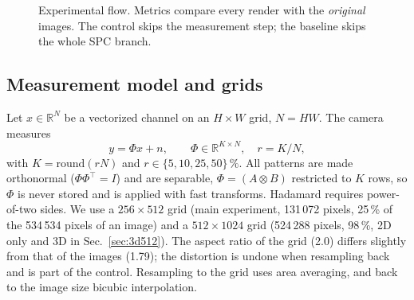 \documentclass[conference]{IEEEtran}
\begin{document}
\begin{figure}[t]
\centering
{}
\caption{Experimental flow. Metrics compare every render with the \emph{original} images. The control skips the measurement step; the baseline skips the whole SPC branch.}
\label{fig:flow}
\end{figure}

\subsection{Measurement model and grids}
Let $x\in\mathbb{R}^{N}$ be a vectorized channel on an $H\times W$ grid, $N=HW$. The camera measures
\begin{equation}
y=\Phi x+n,\qquad \Phi\in\mathbb{R}^{K\times N},\quad r=K/N,
\label{eq:meas}
\end{equation}
with $K=\mathrm{round}(rN)$ and $r\in\{5,10,25,50\}\,\%$. All patterns are made orthonormal ($\Phi\Phi^\top=I$) and are
separable, $\Phi=(A\otimes B)$ restricted to $K$ rows, so $\Phi$ is never stored and is applied with fast transforms.
Hadamard requires power-of-two sides. We use a $256\times512$ grid (main experiment, 131\,072 pixels, 25\,\% of the 534\,534
pixels of an image) and a $512\times1024$ grid (524\,288 pixels, 98\,\%, 2D only and 3D in Sec.~\ref{sec:3d512}).
The aspect ratio of the grid (2.0) differs slightly from that of the images (1.79); the distortion is undone when
resampling back and is part of the control. Resampling to the grid uses area averaging, and back to the image size
bicubic interpolation.
\end{document}

